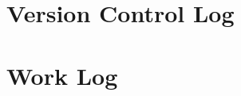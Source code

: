 \documentclass[letterpaper,10pt,titlepage,draftclsnofoot,onecolumn]{IEEEtran}
\begin{document}
\section{Version Control Log}


\section{Work Log}


\nocite{*}



\end{document}
